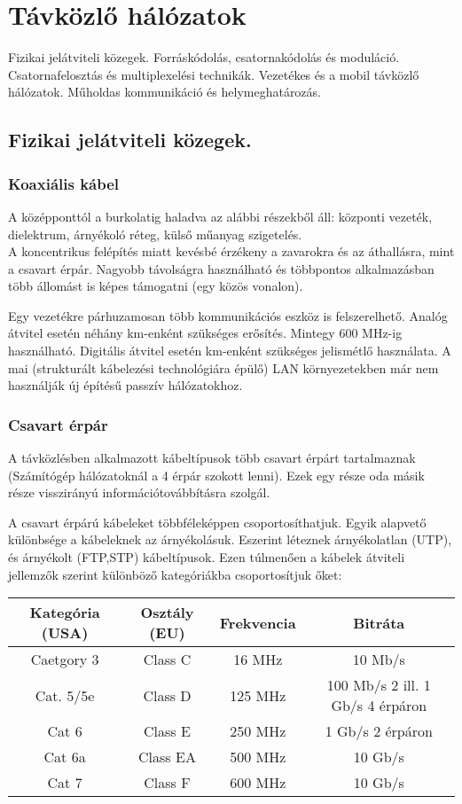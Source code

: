 \section{Távközlő hálózatok}
{\footnotesize Fizikai jelátviteli közegek. Forráskódolás, csatornakódolás és moduláció. Csatornafelosztás és multiplexelési technikák. Vezetékes és a mobil távközlő hálózatok. Műholdas kommunikáció és helymeghatározás.}
\subsection{Fizikai jelátviteli közegek.}

\subsubsection{Koaxiális kábel}
A középponttól a burkolatig haladva az alábbi részekből áll: központi vezeték, dielektrum, árnyékoló réteg, külső műanyag szigetelés.\\
A koncentrikus felépítés miatt kevésbé érzékeny a zavarokra és az áthallásra, mint a csavart érpár. Nagyobb távolságra használható és többpontos alkalmazásban több állomást is képes támogatni (egy közös vonalon).

Egy vezetékre párhuzamosan több kommunikációs eszköz is felszerelhető. 
Analóg átvitel esetén néhány km-enként szükséges erősítés. Mintegy 600 MHz-ig
használható. Digitális átvitel esetén km-enként szükséges jelismétlő használata.
A mai (strukturált kábelezési technológiára épülő) LAN környezetekben már nem
használják új építésű passzív hálózatokhoz.

\subsubsection{Csavart érpár}
A távközlésben alkalmazott kábeltípusok több csavart érpárt tartalmaznak (Számítógép hálózatoknál a 4 érpár szokott lenni). Ezek egy része oda másik része visszirányú információtovábbításra szolgál.

A csavart érpárú kábeleket többféleképpen csoportosíthatjuk. Egyik alapvető különbsége a kábeleknek az árnyékolásuk. Eszerint léteznek árnyékolatlan (UTP), és árnyékolt (FTP,STP) kábeltípusok. Ezen túlmenően a kábelek átviteli jellemzők szerint különböző kategóriákba csoportosítjuk őket:\\
\begin{tabular}{|c|c|c|c|}
	\hline 
	Kategória (USA) & Osztály (EU) & Frekvencia & Bitráta \\ 
	\hline 
	Caetgory 3 & Class C & 16 MHz & 10 Mb/s \\ 
	\hline 
	Cat. 5/5e & Class D & 125 MHz & 100 Mb/s 2 ill. 1 Gb/s 4 érpáron \\ 
	\hline 
	Cat 6 & Class E & 250 MHz & 1 Gb/s 2 érpáron \\ 
	\hline 
	Cat 6a & Class EA & 500 MHz & 10 Gb/s \\ 
	\hline 
	Cat 7 & Class F & 600 MHz & 10 Gb/s \\ 
	\hline 
\end{tabular} 

